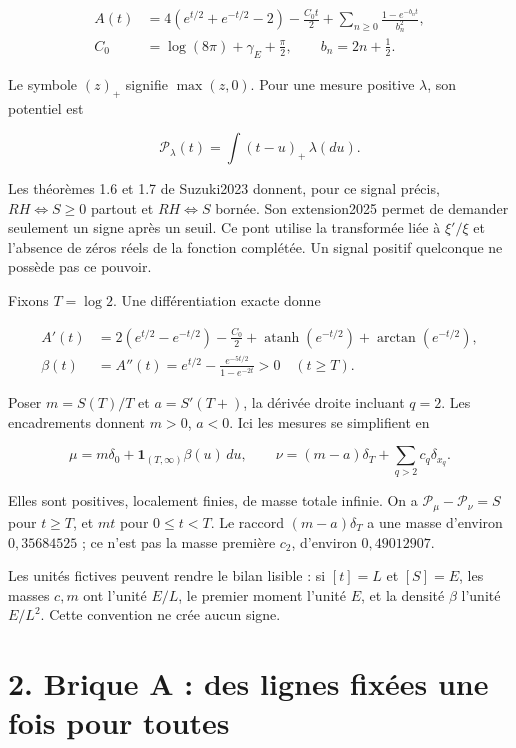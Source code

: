 \documentclass[
  10pt,
  a4paper,
]{article}
\begin{document}
\[
\begin{aligned}
A(t)&=4(e^{t/2}+e^{-t/2}-2)-\frac{C_0t}{2}
       +\sum_{n\ge0}\frac{1-e^{-b_nt}}{b_n^2},\\
C_0&=\log(8\pi)+\gamma_E+\frac{\pi}{2},
\qquad b_n=2n+\frac12.
\end{aligned}
\]

Le symbole \((z)_+\) signifie \(\max(z,0)\). Pour une mesure positive
\(\lambda\), son potentiel est

\[
\mathcal P_\lambda(t)=\int(t-u)_+\,\lambda(du).
\]

Les théorèmes 1.6 et 1.7 de Suzuki2023 donnent, pour ce signal précis,
\(RH\iff S\ge0\) partout et \(RH\iff S\) bornée. Son extension2025
permet de demander seulement un signe après un seuil. Ce pont utilise la
transformée liée à \(\xi'/\xi\) et l'absence de zéros réels de la
fonction complétée. Un signal positif quelconque ne possède pas ce
pouvoir.

Fixons \(T=\log2\). Une différentiation exacte donne

\[
\begin{aligned}
A'(t)&=2(e^{t/2}-e^{-t/2})-\frac{C_0}{2}
       +\operatorname{atanh}(e^{-t/2})+\arctan(e^{-t/2}),\\
\beta(t)&=A''(t)=e^{t/2}
                 -\frac{e^{-5t/2}}{1-e^{-2t}}>0\quad(t\ge T).
\end{aligned}
\]

Poser \(m=S(T)/T\) et \(a=S'(T+)\), la dérivée droite incluant \(q=2\).
Les encadrements donnent \(m>0\), \(a<0\). Ici les mesures se
simplifient en

\[
\mu=m\delta_0+\mathbf1_{(T,\infty)}\beta(u)\,du,\qquad
\nu=(m-a)\delta_T+\sum_{q>2}c_q\delta_{x_q}.
\]

Elles sont positives, localement finies, de masse totale infinie. On a
\(\mathcal P_\mu-\mathcal P_\nu=S\) pour \(t\ge T\), et \(mt\) pour
\(0\le t<T\). Le raccord \((m-a)\delta_T\) a une masse d'environ
\(0{,}35684525\) ; ce n'est pas la masse première \(c_2\), d'environ
\(0{,}49012907\).

Les unités fictives peuvent rendre le bilan lisible : si \([t]=L\) et
\([S]=E\), les masses \(c,m\) ont l'unité \(E/L\), le premier moment
l'unité \(E\), et la densité \(\beta\) l'unité \(E/L^2\). Cette
convention ne crée aucun signe.

\hypertarget{brique-a-des-lignes-fixuxe9es-une-fois-pour-toutes}{%
\section{2. Brique A : des lignes fixées une fois pour
toutes}\label{brique-a-des-lignes-fixuxe9es-une-fois-pour-toutes}}
\end{document}
